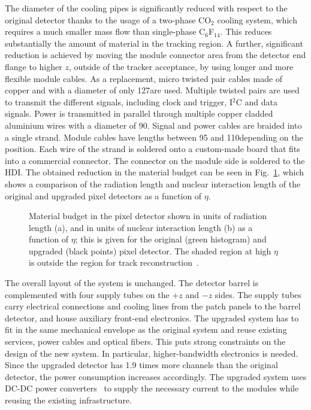 The diameter of the cooling pipes is significantly reduced with respect to the original detector thanks to the usage of a two-phase CO$_2$ cooling system, which requires a much smaller mass flow than single-phase C$_6$F$_{14}$.
This reduces substantially the amount of material in the tracking region. A further, significant reduction is achieved by moving the module connector area from the detector end flange to higher $z$, outside of the tracker acceptance, by using longer and more flexible module cables. As a replacement, micro twisted pair cables made of copper and with a diameter of only 127\mum are used.
Multiple twisted pairs are used to transmit the different signals, including clock and trigger, I$^2$C and data signals. Power is transmitted in parallel through multiple copper cladded aluminium wires with a diameter of 90\mum. Signal and power cables are braided into a single strand. Module cables have lengths between 95 and 110\cm depending on the position. Each wire of the strand is soldered onto a custom-made board that fits into a commercial connector. The connector on the module side is soldered to the HDI.
The obtained reduction in the material budget can be seen in Fig.~\ref{fig:Phase1Budget}, which shows a comparison of the radiation length and nuclear interaction length of the original and upgraded pixel detectors as a function of $\eta$.

\begin{figure}[!htb]
 \begin{center}
 \end{center}
 \caption{Material budget in the pixel detector shown in units of radiation length (a), and in units of nuclear interaction length (b) as a function of $\eta$; this is given for the original (green histogram) and upgraded (black points) pixel detector. The shaded region at high $\eta$ is outside the region for track reconstruction~\cite{Dominguez:1481838}.}
 \label{fig:Phase1Budget}
\end{figure}

The overall layout of the system is unchanged. The detector barrel is complemented with four supply tubes on the $+z$ and $-z$ sides. The supply tubes carry electrical connections and cooling lines from the patch panels to the barrel detector, and house auxiliary front-end electronics. The upgraded system has to fit in the same mechanical envelope as the original system and reuse existing services, power cables and optical fibers. This puts strong constraints on the design of the new system. In particular, higher-bandwidth electronics is needed. Since the upgraded detector has 1.9 times more channels than the original detector, the power consumption increases accordingly. The upgraded system uses DC-DC power converters~\cite{1748-0221-10-01-C01052} to supply the necessary current to the modules while reusing the existing infrastructure.

